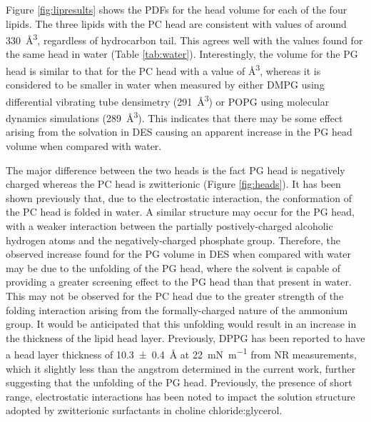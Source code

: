 \documentclass[twocolumn,a4paper]{paper}
\begin{document}
Figure \ref{fig:lipresults} shows the PDFs for the head volume for each of the four lipids.
The three lipids with the PC head are consistent with values of around \SI{330}{\cubic\angstrom}, regardless of hydrocarbon tail.
This agrees well with the values found for the same head in water (Table \ref{tab:water}).
Interestingly, the volume for the PG head is similar to that for the PC head with a value of \si{\cubic\angstrom}, whereas it is considered to be smaller in water when measured by either DMPG using differential vibrating tube densimetry\cite{Pan2012} (\SI{291}{\cubic\angstrom}) or POPG using molecular dynamics simulations\cite{Kucerka2012} (\SI{289}{\cubic\angstrom}).
This indicates that there may be some effect arising from the solvation in DES causing an apparent increase in the PG head volume when compared with water.

The major difference between the two heads is the fact PG head is negatively charged whereas the PC head is zwitterionic (Figure \ref{fig:heads}).
It has been shown previously that, due to the electrostatic interaction, the conformation of the PC head is folded in water\cite{Gilliams2016}.
A similar structure may occur for the PG head, with a weaker interaction between the partially postively-charged alcoholic hydrogen atoms and the negatively-charged phosphate group.
Therefore, the observed increase found for the PG volume in DES when compared with water may be due to the unfolding of the PG head, where the solvent is capable of providing a greater screening effect to the PG head than that present in water.
This may not be observed for the PC head due to the greater strength of the folding interaction arising from the formally-charged nature of the ammonium group.
It would be anticipated that this unfolding would result in an increase in the thickness of the lipid head layer.
Previously, DPPG has been reported to have a head layer thickness of \SI[separate-uncertainty=true]{10.3\pm0.4}{\angstrom} at \SI{22}{\milli\newton\per\meter} from NR measurements\cite{Clifton2012}, which it slightly less than the \si{angstrom} determined in the current work, further suggesting that the unfolding of the PG head.
Previously, the presence of short range, electrostatic interactions has been noted to impact the solution structure adopted by zwitterionic surfactants in choline chloride:glycerol\cite{Sanchez-Fernandez2018}.
\end{document}
